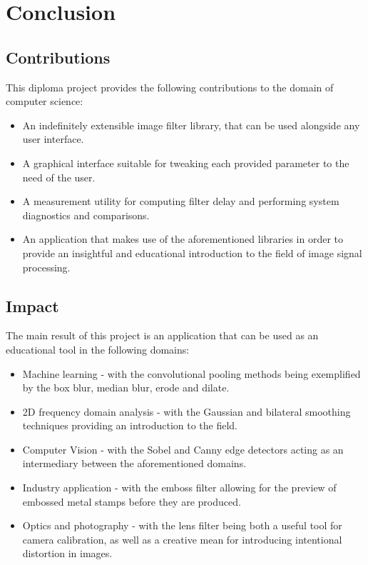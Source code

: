 \chapter{Conclusion}

\section{Contributions}

This diploma project provides the following contributions to the domain of computer science:
\begin{itemize}
	\item An indefinitely extensible image filter library, that can be used alongside any user interface.
	\item A graphical interface suitable for tweaking each provided parameter to the need of the user.
	\item A measurement utility for computing filter delay and performing system diagnostics and comparisons.
	\item An application that makes use of the aforementioned libraries in order to provide an insightful and
	      educational introduction to the field of image signal processing.
\end{itemize}

\section{Impact}

The main result of this project is an application that can be used as an educational tool in the following
domains:
\begin{itemize}
	\item Machine learning - with the convolutional pooling methods being exemplified by the box blur, median
	      blur, erode and dilate.
	\item 2D frequency domain analysis - with the Gaussian and bilateral smoothing techniques providing an
	      introduction to the field.
	\item Computer Vision - with the Sobel and Canny edge detectors acting as an intermediary between the
	      aforementioned domains.
	\item Industry application - with the emboss filter allowing for the preview of embossed metal stamps
	      before they are produced.
	\item Optics and photography - with the lens filter being both a useful tool for camera calibration, as
	      well as a creative mean for introducing intentional distortion in images.
\end{itemize}



